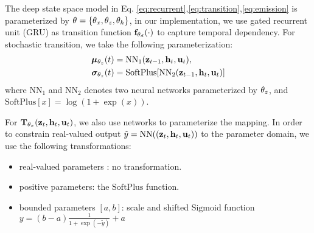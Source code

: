 \documentclass{article}
\begin{document}
The deep state space model in Eq. \ref{eq:recurrent},\ref{eq:transition},\ref{eq:emission} is parameterized by $\bt=\{\bt[x], \bt[z], \bt[h]\}$, in our implementation, we use gated recurrent unit (GRU)\cite{cho2014learning} as transition function $\mathbf{f}_{\bt[d]}(\cdot)$ to capture temporal dependency. For stochastic transition, we take the following parameterization:
\begin{equation}
\begin{split}
    \bmu_{\bt[z]}(t) &= \text{NN}_1 (\bz_{t-1}, \bh_t, \bu_t),\\
    \bsigma_{\bt[z]}(t) &= \text{SoftPlus}[\text{NN}_2 (\bz_{t-1}, \bh_t, \bu_t)]
\end{split}
\end{equation}
where $\text{NN}_1$ and $\text{NN}_2$ denotes two neural networks parameterized by $\bt[z]$, and $\text{SoftPlus}[x] = \log(1+\exp(x))$.

For $\mathbf{T}_{\bt[x]}(\bz_{t},\bh_t, \bu_t)$, we also use networks to parameterize the mapping. In order to constrain real-valued output $\tilde{y}=\text{NN}((\bz_{t},\bh_t, \bu_t))$ to the parameter domain, we use the following transformations:
\begin{itemize}
    \item real-valued parameters : no transformation.
    \item positive parameters: the $\text{SoftPlus}$ function.
    \item bounded parameters $[a,b]$: scale and shifted $\text{Sigmoid}$ function $y = (b-a)\frac{1}{1+\exp(-\tilde{y})}+a$
\end{itemize}
\end{document}
